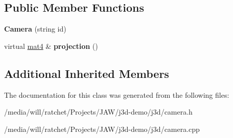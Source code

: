 \subsection*{Public Member Functions}
\begin{DoxyCompactItemize}
\item 
\hypertarget{classj3d_1_1Camera_a5610d622d15122d22f23c3c03ad2aebf}{}{\bfseries Camera} (string id)\label{classj3d_1_1Camera_a5610d622d15122d22f23c3c03ad2aebf}

\item 
\hypertarget{classj3d_1_1Camera_a39e3f7635779c0213e8782e83a06fb9b}{}virtual \hyperlink{structj3d_1_1mat4}{mat4} \& {\bfseries projection} ()\label{classj3d_1_1Camera_a39e3f7635779c0213e8782e83a06fb9b}

\end{DoxyCompactItemize}
\subsection*{Additional Inherited Members}


The documentation for this class was generated from the following files\+:\begin{DoxyCompactItemize}
\item 
/media/will/ratchet/\+Projects/\+J\+A\+W/j3d-\/demo/j3d/camera.\+h\item 
/media/will/ratchet/\+Projects/\+J\+A\+W/j3d-\/demo/j3d/camera.\+cpp\end{DoxyCompactItemize}
